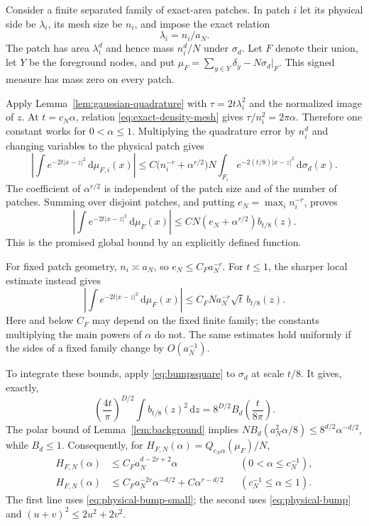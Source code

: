 \documentclass[11pt,a4paper]{article}
\theoremstyle{definition}
\newcommand{\dd}{\,\mathrm d}
\newcommand{\abs}[1]{\lvert#1\rvert}
\numberwithin{equation}{section}
\begin{document}
Consider a finite separated family of exact-area patches. In patch $i$ let its physical side be $\lambda_i$, its mesh size be $n_i$, and impose the exact relation
\begin{equation}\label{eq:exact-density-mesh}
 \lambda_i=n_i/a_N.
\end{equation}
The patch has area $\lambda_i^d$ and hence mass $n_i^d/N$ under $\sigma_d$. Let $F$ denote their union, let $Y$ be the foreground nodes, and put
$\mu_F=\sum_{y\in Y}\delta_y-N\sigma_d|_F$.
This signed measure has mass zero on every patch.

Apply Lemma~\ref{lem:gaussian-quadrature} with
$\tau=2t\lambda_i^2$ and the normalized image of $z$. At $t=c_N\alpha$, relation \eqref{eq:exact-density-mesh} gives $\tau/n_i^2=2\pi\alpha$. Therefore one constant works for $0<\alpha\le1$. Multiplying the quadrature error by $n_i^d$ and changing variables to the physical patch gives
\[
 \left|\int e^{-2t\abs{x-z}^2}\dd\mu_{F,i}(x)\right|
 \le C\bigl(n_i^{-r}+\alpha^{r/2}\bigr)
       N\int_{F_i}e^{-2(t/8)\abs{x-z}^2}\dd\sigma_d(x).
\]
The coefficient of $\alpha^{r/2}$ is independent of the patch size and of the number of patches. Summing over disjoint patches, and putting $e_N=\max_i n_i^{-r}$, proves
\begin{equation}\label{eq:physical-bump}
 \left|\int e^{-2t\abs{x-z}^2}\dd\mu_F(x)\right|
       \le CN(e_N+\alpha^{r/2})b_{t/8}(z).
\end{equation}
This is the promised global bound by an explicitly defined function.

For fixed patch geometry, $n_i\asymp a_N$, so $e_N\le C_Fa_N^{-r}$. For $t\le1$, the sharper local estimate instead gives
\begin{equation}\label{eq:physical-bump-small}
 \left|\int e^{-2t\abs{x-z}^2}\dd\mu_F(x)\right|
       \le C_FN a_N^{-r}\sqrt t\,b_{t/8}(z).
\end{equation}
Here and below $C_F$ may depend on the fixed finite family; the constants multiplying the main powers of $\alpha$ do not. The same estimates hold uniformly if the sides of a fixed family change by $O(a_N^{-1})$.

To integrate these bounds, apply \eqref{eq:bumpsquare} to $\sigma_d$ at scale $t/8$. It gives, exactly,
\begin{equation}\label{eq:envelope-square-integral}
 \left(\frac{4t}{\pi}\right)^{D/2}\int b_{t/8}(z)^2\dd z
       =8^{D/2}B_d\left(\frac{t}{8\pi}\right).
\end{equation}
The polar bound of Lemma~\ref{lem:background} implies
$N B_d(a_N^2\alpha/8)\le8^{d/2}\alpha^{-d/2}$, while $B_d\le1$.
Consequently, for $H_{F,N}(\alpha)=Q_{c_N\alpha}(\mu_F)/N$,
\begin{align}
 H_{F,N}(\alpha)&\le C_F a_N^{d-2r+2}\alpha
                  &&(0<\alpha\le c_N^{-1}),\label{eq:submesh-budget}\\
 H_{F,N}(\alpha)&\le C_F a_N^{-2r}\alpha^{-d/2}
                         +C\alpha^{r-d/2}
                  &&(c_N^{-1}\le\alpha\le1).\label{eq:foreground-budget}
\end{align}
The first line uses \eqref{eq:physical-bump-small}; the second uses \eqref{eq:physical-bump} and $(u+v)^2\le2u^2+2v^2$.
\end{document}
